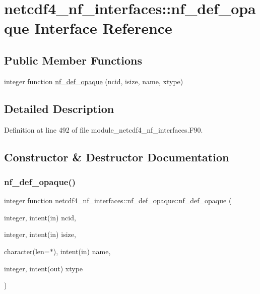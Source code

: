 \hypertarget{interfacenetcdf4__nf__interfaces_1_1nf__def__opaque}{}\section{netcdf4\+\_\+nf\+\_\+interfaces\+:\+:nf\+\_\+def\+\_\+opaque Interface Reference}
\label{interfacenetcdf4__nf__interfaces_1_1nf__def__opaque}
\subsection*{Public Member Functions}
\begin{DoxyCompactItemize}
\item 
integer function \hyperlink{interfacenetcdf4__nf__interfaces_1_1nf__def__opaque_a60fd23caff14685080a16d22d1f4a088}{nf\+\_\+def\+\_\+opaque} (ncid, isize, name, xtype)
\end{DoxyCompactItemize}


\subsection{Detailed Description}


Definition at line 492 of file module\+\_\+netcdf4\+\_\+nf\+\_\+interfaces.\+F90.



\subsection{Constructor \& Destructor Documentation}
\mbox{\label{interfacenetcdf4__nf__interfaces_1_1nf__def__opaque_a60fd23caff14685080a16d22d1f4a088}} 
\subsubsection{\texorpdfstring{nf\+\_\+def\+\_\+opaque()}{nf\_def\_opaque()}}
{\footnotesize\ttfamily integer function netcdf4\+\_\+nf\+\_\+interfaces\+::nf\+\_\+def\+\_\+opaque\+::nf\+\_\+def\+\_\+opaque (\begin{DoxyParamCaption}\item[{integer, intent(in)}]{ncid,  }\item[{integer, intent(in)}]{isize,  }\item[{character(len=$\ast$), intent(in)}]{name,  }\item[{integer, intent(out)}]{xtype }\end{DoxyParamCaption})}



